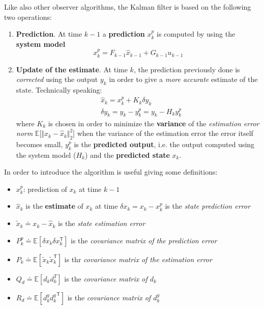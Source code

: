 Like also other observer algorithms, the Kalman filter is based on the following two operations:
\begin{enumerate}
    \item \textsf{\textbf{Prediction}}. At time $k-1$ a \textbf{prediction} $x_k^p$ is computed by using the \textbf{system model} 
    \begin{equation}
        x_k^p  = F_{k-1}\hat{x}_{k-1} + G_{k-1} u_{k-1}
    \end{equation}
    \item \textsf{\textbf{Update of the estimate}}. At time $k$, the prediction previously done is \textit{corrected} using the output $y_k$ in order to give a \textit{more accurate} estimate of the state. Technically speaking:
    \begin{equation}
        \begin{aligned}
            &\hat{x}_k = x_k^p + K_k \delta y_k\\
            &\delta y_k = y_k - y_k^p = y_k - H_k y_k^p
        \end{aligned}
    \end{equation} 
    where $K_k$ is chosen in order to minimize the \textbf{variance} of the \textit{estimation error norm} $\mathbb{E}\big[
        \Vert x_k-\hat{x}_k \Vert_2^2
    \big]$ when the variance of the estimation error the error itself becomes small, $y_k^p$ is the \textbf{predicted output}, i.e. the output computed using the system model ($H_k$) and the \textbf{predicted state} $x_k$.
\end{enumerate}
In order to introduce the algorithm is useful giving some definitions: 
\begin{itemize}
    \itemsep0em
    \item $x_k^p$: prediction of $x_k$ at time $k-1$
    \item $\hat{x}_k$ is the \textbf{estimate} of $x_k$ at time $\delta x_k=x_k-x_k^p$ is the \textit{state prediction error}
    \item $\tilde{x}_k\doteq x_k-\hat{x}_k$  is the \textit{state estimation error}
    \item $P_k^p\doteq\mathbb{E}[\delta x_k \delta x_k^\textsf{T}]$ is the \textit{covariance matrix of the prediction error}
    \item $P_k\doteq \mathbb{E}[\tilde{x}_k \tilde{x}_k^{\textsf{T}}]$ is thr \textit{covariance matrix of the estimation error}
    \item $Q_d \doteq \mathbb{E}[d_k d_k^T]$ is the \textit{covariance matrix of $d_k$}
    \item $R_d \doteq \mathbb{E}[d_k^y {d_k^y}^{\textsf{T}}]$ is the \textit{covariance matrix of $d_k^y$}
\end{itemize}

